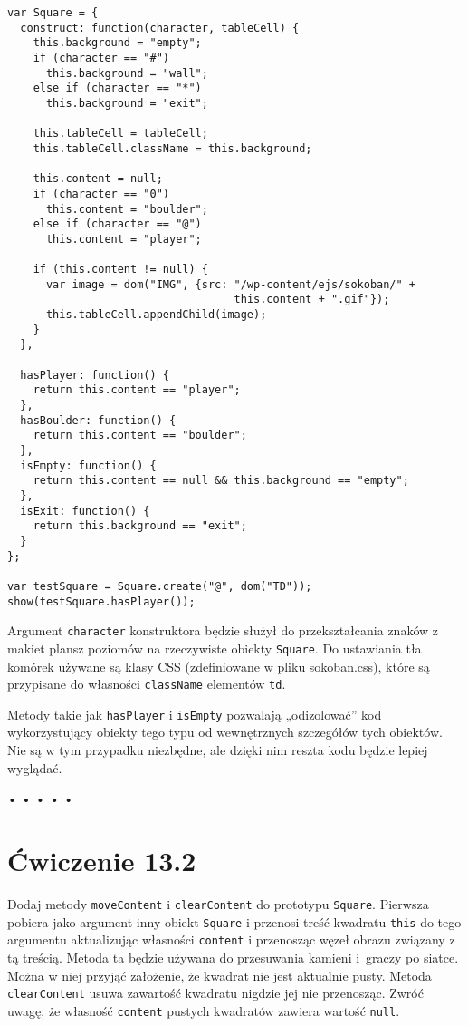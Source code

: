   
\begin{verbatim} 
var Square = {
  construct: function(character, tableCell) {
    this.background = "empty";
    if (character == "#")
      this.background = "wall";
    else if (character == "*")
      this.background = "exit";

    this.tableCell = tableCell;
    this.tableCell.className = this.background;

    this.content = null;
    if (character == "0")
      this.content = "boulder";
    else if (character == "@")
      this.content = "player";

    if (this.content != null) {
      var image = dom("IMG", {src: "/wp-content/ejs/sokoban/" +
                                   this.content + ".gif"});
      this.tableCell.appendChild(image);
    }
  },

  hasPlayer: function() {
    return this.content == "player";
  },
  hasBoulder: function() {
    return this.content == "boulder";
  },
  isEmpty: function() {
    return this.content == null && this.background == "empty";
  },
  isExit: function() {
    return this.background == "exit";
  }
};

var testSquare = Square.create("@", dom("TD"));
show(testSquare.hasPlayer());
 \end{verbatim}
  
Argument \texttt{character} konstruktora będzie służył do przekształcania znaków z makiet plansz poziomów na rzeczywiste obiekty \texttt{Square}. Do ustawiania tła komórek używane są klasy CSS (zdefiniowane w pliku sokoban.css), które są przypisane do własności \texttt{className} elementów \texttt{td}.

  
Metody takie jak \texttt{hasPlayer} i \texttt{isEmpty} pozwalają „odizolować” kod wykorzystujący obiekty tego typu od wewnętrznych szczegółów tych obiektów. Nie są w tym przypadku niezbędne, ale dzięki nim reszta kodu będzie lepiej wyglądać.



\begin{center}
• • • • •
\end{center}

  
\section*{Ćwiczenie 13.2}
\label{sec:13.2}
  
    
Dodaj metody \texttt{moveContent} i \texttt{clearContent} do prototypu \texttt{Square}. Pierwsza pobiera jako argument inny obiekt \texttt{Square} i przenosi treść kwadratu \texttt{this} do tego argumentu aktualizując własności \texttt{content} i przenosząc węzeł obrazu związany z tą treścią. Metoda ta będzie używana do przesuwania kamieni i~graczy po siatce. Można w niej przyjąć założenie, że kwadrat nie jest aktualnie pusty. Metoda \texttt{clearContent} usuwa zawartość kwadratu nigdzie jej nie przenosząc. Zwróć uwagę, że własność \texttt{content} pustych kwadratów zawiera wartość \texttt{null}.

